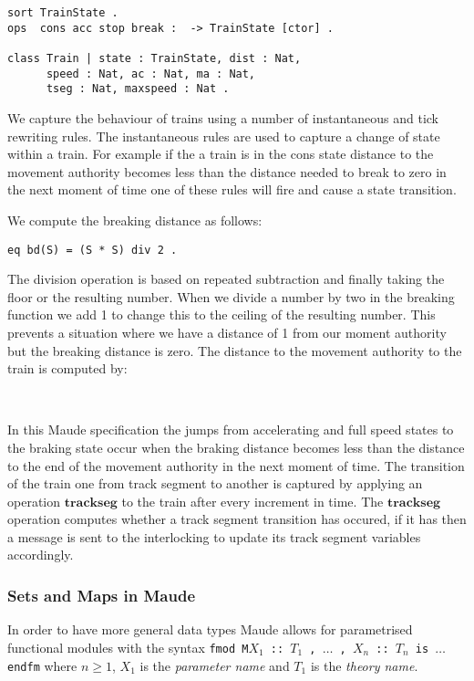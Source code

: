 \begin{lstlisting}
sort TrainState .
ops  cons acc stop break :  -> TrainState [ctor] .

class Train | state : TrainState, dist : Nat, 
      speed : Nat, ac : Nat, ma : Nat, 
      tseg : Nat, maxspeed : Nat .
\end{lstlisting}

We capture the behaviour of trains using a number of instantaneous and tick rewriting rules. The instantaneous rules are used to capture a change of state within a train. For example if the a train is in the cons state distance to the movement authority becomes less than the distance needed to break to zero in the next moment of time one of these rules will fire and cause a state transition. 

We compute the breaking distance as follows: 
\begin{center}\texttt{eq bd(S) = (S * S) div 2 .}\end{center}


The division operation is based on repeated subtraction and finally taking the floor or the resulting number. When we divide a number by two in the breaking function we add 1 to change this to the ceiling of the resulting number. This prevents a situation where we have a distance of 1 from our moment authority but the breaking distance is zero.
The distance to the movement authority to the train is computed by:
\begin{center}
\texttt{} \\
\texttt{}
\end{center}

In this Maude specification the jumps from accelerating and full speed states to the braking state occur when the braking distance becomes less than the distance to the end of the movement authority in the next moment of time.  The transition of the train one from track segment to another is captured by applying an operation $\textbf{trackseg}$ to the train after every increment in time. The $\textbf{trackseg}$ operation computes whether a track segment transition has occured, if it has then a message is sent to the interlocking to update its track segment variables accordingly.

\subsubsection*{Sets and Maps in Maude}
In order to have more general data types Maude allows for parametrised functional modules with the  syntax \texttt{fmod M{$X_1$ :: $T_1$ , $\ldots$ , $X_n$ :: $T_n$} is $\ldots$ endfm} where $n \geq 1$, $X_1$ is the \emph{parameter name} and $T_1$ is the \emph{theory name}.


